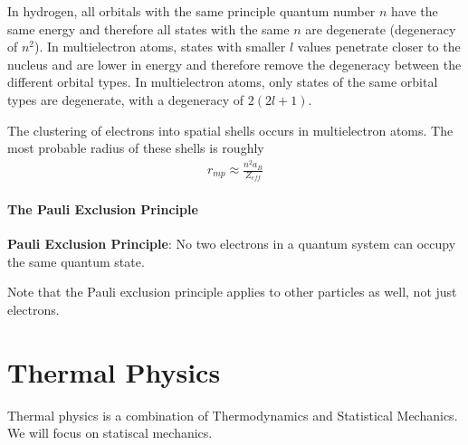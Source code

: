 \documentclass[10pt]{article}
\begin{document}
In hydrogen, all orbitals with the same principle quantum number $n$ have the same energy and therefore all states with the same $n$ are degenerate (degeneracy of $n^2$). In multielectron atoms, states with smaller $l$ values penetrate closer to the nucleus and are lower in energy and therefore remove the degeneracy between the different orbital types. In multielectron atoms, only states of the same orbital types are degenerate, with a degeneracy of $2(2l+1)$.

The clustering of electrons into spatial shells occurs in multielectron atoms. The most probable radius of these shells is roughly
\begin{align}
    r_{mp} \approx \frac{n^2 a_B}{Z_{eff}}    
\end{align}

\subsection{The Pauli Exclusion Principle}
\begin{theorem}
    \textbf{Pauli Exclusion Principle}: No two electrons in a quantum system can occupy the same quantum state. 
\end{theorem}
Note that the Pauli exclusion principle applies to other particles as well, not just electrons.




\newpage
\part{Thermal Physics}
Thermal physics is a combination of Thermodynamics and Statistical Mechanics. We will focus on statiscal mechanics.
\end{document}
